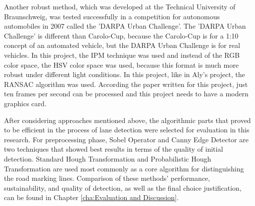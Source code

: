 Another robust method\cite{A_Fast_and_Robust_Approach}, which was developed at the Technical University of Braunschweig, was tested successfully in a competition for autonomous automobiles in 2007 called the 'DARPA Urban Challenge'. The 'DARPA Urban Challenge' is different than Carolo-Cup, because the Carolo-Cup is for a 1:10 concept of an automated vehicle, but the DARPA Urban Challenge is for real vehicles. In this project, the IPM technique was used and instead of the RGB color space, the HSV color space was used, because this format is much more robust under different light conditions. In this project, like in Aly's project, the RANSAC algorithm was used. According the paper written for this project, just ten frames per second can be processed and this project needs to have a modern graphics card.

After considering approaches mentioned above, the algorithmic parts that proved to be efficient in the process of lane detection were selected for evaluation in this research. For preprocessing phase, Sobel Operator and Canny Edge Detector are two techniques that showed best results in terms of the quality of initial detection. Standard Hough Transformation and Probabilistic Hough Transformation are used most commonly as a core algorithm for distinguishing the road marking lines. Comparison of these methods' performance, sustainability, and quality of detection, as well as the final choice justification, can be found in Chapter \ref{cha:Evaluation and Discussion}. 

